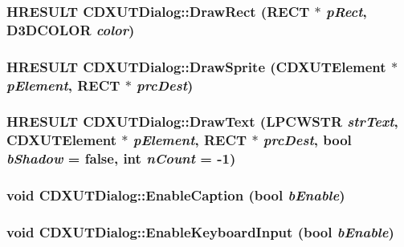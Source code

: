\label{class_c_d_x_u_t_dialog_ad3345a7a307fa37e32cb3035a127306f}
\hypertarget{class_c_d_x_u_t_dialog_adccd346391230d10adfe508ee29a2a8d}{
\subsubsection[{DrawRect}]{\setlength{\rightskip}{0pt plus 5cm}HRESULT CDXUTDialog::DrawRect (RECT $\ast$ {\em pRect}, \/  D3DCOLOR {\em color})}}
\label{class_c_d_x_u_t_dialog_adccd346391230d10adfe508ee29a2a8d}
\hypertarget{class_c_d_x_u_t_dialog_adeac22d23d8ec3cf2db5ba7ac28d3c61}{
\subsubsection[{DrawSprite}]{\setlength{\rightskip}{0pt plus 5cm}HRESULT CDXUTDialog::DrawSprite ({\bf CDXUTElement} $\ast$ {\em pElement}, \/  RECT $\ast$ {\em prcDest})}}
\label{class_c_d_x_u_t_dialog_adeac22d23d8ec3cf2db5ba7ac28d3c61}
\hypertarget{class_c_d_x_u_t_dialog_a78b6b17501a7342ccfac5d22314d12c4}{
\subsubsection[{DrawText}]{\setlength{\rightskip}{0pt plus 5cm}HRESULT CDXUTDialog::DrawText (LPCWSTR {\em strText}, \/  {\bf CDXUTElement} $\ast$ {\em pElement}, \/  RECT $\ast$ {\em prcDest}, \/  bool {\em bShadow} = {\ttfamily false}, \/  {\bf int} {\em nCount} = {\ttfamily -\/1})}}
\label{class_c_d_x_u_t_dialog_a78b6b17501a7342ccfac5d22314d12c4}
\hypertarget{class_c_d_x_u_t_dialog_ac0fabdca39baa6ed68e5754f99cf5b81}{
\subsubsection[{EnableCaption}]{\setlength{\rightskip}{0pt plus 5cm}void CDXUTDialog::EnableCaption (bool {\em bEnable})}}
\label{class_c_d_x_u_t_dialog_ac0fabdca39baa6ed68e5754f99cf5b81}
\hypertarget{class_c_d_x_u_t_dialog_a0022392f6e443b015ad8692aa6ab5442}{
\subsubsection[{EnableKeyboardInput}]{\setlength{\rightskip}{0pt plus 5cm}void CDXUTDialog::EnableKeyboardInput (bool {\em bEnable})}}
